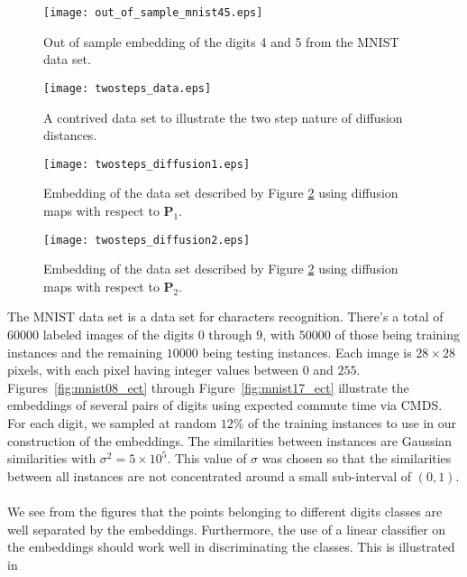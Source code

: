 \documentclass[10pt,twocolumn]{article}
\numberwithin{equation}{section}
\begin{document}
\begin{figure}[htbp]
  \begin{center}
    \texttt{[image: out\_of\_sample\_mnist45.eps]}
    \caption{Out of sample embedding of the digits 4 and 5 from the MNIST data
    set. }  
  \label{fig:out_of_sample_mnist45}
  \end{center}
\end{figure}    
\begin{figure}[htbp]
  \centering
  \texttt{[image: twosteps\_data.eps]}
  \caption{A contrived data set to illustrate the two step nature of
    diffusion distances.}
  \label{fig:embed2-a}
\end{figure}
\begin{figure}[htbp]
  \centering
  \texttt{[image: twosteps\_diffusion1.eps]}
  \caption{Embedding of the data set described by
    Figure \ref{fig:embed2-a} using diffusion maps with respect to
    $\mathbf{P}_1$.}
  \label{fig:embed2-b}
\end{figure}
\begin{figure}[htbp]
  \centering
  \texttt{[image: twosteps\_diffusion2.eps]}
  \caption{Embedding of the data set described by
    Figure \ref{fig:embed2-a} using diffusion maps with respect to
    $\mathbf{P}_2$.}
  \label{fig:embed2-c}
\end{figure}
The MNIST data set \citep{lecun98:_gradien} is a data set for
characters recognition. There's a total of $60000$ labeled images of
the digits $0$ through $9$, with $50000$ of those being training
instances and the remaining $10000$ being testing instances. Each
image is $28 \times 28$ pixels, with each pixel having integer values
between $0$ and $255$. Figures~\ref{fig:mnist08_ect} through
Figure~\ref{fig:mnist17_ect} illustrate the embeddings of several
pairs of digits using expected commute time via CMDS. For
each digit, we sampled at random $12$\% of the training instances to
use in our construction of the embeddings. The similarities between
instances are Gaussian similarities with $\sigma^2 = 5 \times
10^5$. This value of $\sigma$ was chosen so that the similarities
between all instances are not concentrated around a small sub-interval
of $(0,1)$.  \\ \\
\noindent We see from the figures that the points belonging to different digits
classes are well separated by the embeddings. Furthermore, the use of
a linear classifier on the embeddings should work well in
discriminating the classes. This is illustrated in
\end{document}
